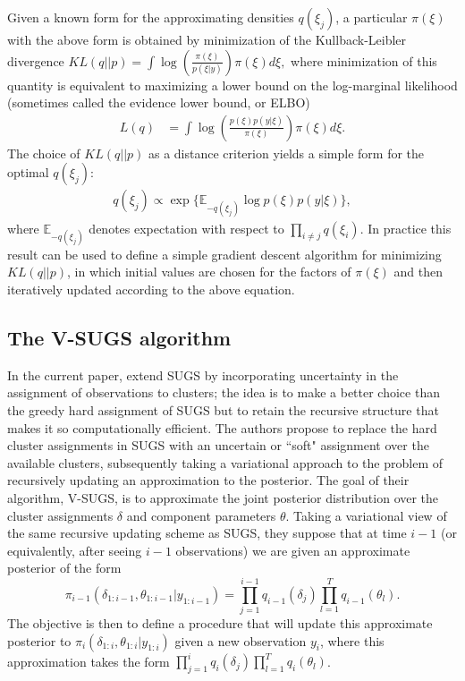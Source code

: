 \documentclass{uwstat572}
\begin{document}
Given a known form for the approximating densities $q(\xi_j)$, a particular $\pi(\xi)$ with the above form is obtained by minimization of the Kullback-Leibler divergence $ KL(q || p) = \int \log \left(\frac{\pi(\xi)}{p(\xi|y)}\right) \pi(\xi) d\xi,$
where minimization of this quantity is equivalent to maximizing a lower bound on the log-marginal likelihood (sometimes called the evidence lower bound, or ELBO)
\begin{align} L(q) &= \int \log \left(\frac{p(\xi)p(y | \xi)}{\pi(\xi)} \right)\pi(\xi) d\xi. \label{eq:vbloglik} \end{align}
The choice of $KL(q||p)$ as a distance criterion yields a simple form for the optimal $q(\xi_j)$:
\begin{align} q(\xi_j) \propto \exp\{ \mathbb{E}_{-q(\xi_j)} \log p(\xi) p(y | \xi) \}, \label{eq:vbupdate} \end{align}
where $ \mathbb{E}_{-q(\xi_j)}$ denotes expectation with respect to $\prod_{i\neq j} q(\xi_i)$. In practice this result can be used to define a simple gradient descent algorithm for minimizing $KL(q||p)$, in which initial values are chosen for the factors of $\pi(\xi)$ and then iteratively updated according to the above equation. 

\subsection{The V-SUGS algorithm}

In the current paper, \cite{zhang} extend SUGS by incorporating uncertainty in the assignment of observations to clusters; the idea is to make a better choice than the greedy hard assignment of SUGS but to retain the recursive structure that makes it so computationally efficient. The authors propose to replace the hard cluster assignments in SUGS with an uncertain or ``soft" assignment over the available clusters, subsequently taking a variational approach to the problem of recursively updating an approximation to the posterior. The goal of their algorithm, V-SUGS, is to approximate the joint posterior distribution over the cluster assignments $\delta$ and component parameters $\theta$. Taking a variational view of the same recursive updating scheme as SUGS, they suppose that at time $i-1$ (or equivalently, after seeing $i-1$ observations) we are given an approximate posterior of the form
$$ \pi_{i-1}(\delta_{1:i-1},\theta_{1:i-1} | y_{1:i-1}) = \prod_{j=1}^{i-1} q_{i-1}(\delta_j) \prod_{l=1}^T q_{i-1}(\theta_l).$$
The objective is then to define a procedure that will update this approximate posterior to $\pi_{i}(\delta_{1:i},\theta_{1:i} | y_{1:i})$ given a new observation $y_i$, where this approximation takes the form $\prod_{j=1}^{i} q_{i}(\delta_j) \prod_{l=1}^T q_{i}(\theta_l)$.
\end{document}
